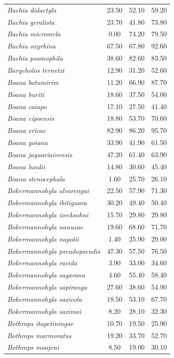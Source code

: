 \documentclass[12pt,openright,oneside,a4paper,english]{abntex2}
\begin{document}
\begin{longtable}{lccc}
	\textit{Bachia didactyla}&23.50 &52.10 &59.20 \\
	\textit{Bachia geralista}&23.70 &41.80 &73.80 \\
	\textit{Bachia micromela}&0.00 &74.20 &79.50 \\
	\textit{Bachia oxyrhina}&67.50 &67.80 &92.60 \\
	\textit{Bachia psamophila}&38.60 &82.60 &83.50 \\
	\textit{Barycholos ternetzi}&12.90 &31.20 &52.60 \\
	\textit{Boana botumirim}&11.20 &66.90 &87.70 \\
	\textit{Boana buriti}&18.60 &37.50 &54.00 \\
	\textit{Boana caiapo}&17.10 &27.50 &41.40 \\
	\textit{Boana cipoensis}&18.80 &53.70 &70.60 \\
	\textit{Boana ericae}&82.90 &86.20 &95.70 \\
	\textit{Boana goiana}&33.90 &41.90 &61.50 \\
	\textit{Boana jaguariaivensis}&47.20 &61.40 &63.90 \\
	\textit{Boana lundii}&14.80 &30.60 &45.40 \\
	\textit{Boana stenocephala}&1.60 &25.70 &26.10 \\
	\textit{Bokermannohyla alvarengai}&22.50 &57.90 &71.30 \\
	\textit{Bokermannohyla ibitiguara}&30.20 &49.40 &50.40 \\
	\textit{Bokermannohyla izecksohni}&15.70 &29.80 &29.80 \\
	\textit{Bokermannohyla nanuzae}&19.60 &68.60 &71.70 \\
	\textit{Bokermannohyla napolii}&1.40 &25.90 &29.00 \\
	\textit{Bokermannohyla pseudopseudis}&47.30 &57.50 &76.50 \\
	\textit{Bokermannohyla ravida}&3.90 &33.00 &34.60 \\
	\textit{Bokermannohyla sagarana}&4.60 &55.40 &58.40 \\
	\textit{Bokermannohyla sapiranga}&27.60 &38.60 &54.90 \\
	\textit{Bokermannohyla saxicola}&18.50 &53.10 &67.70 \\
	\textit{Bokermannohyla sazimai}&8.20 &28.10 &32.30 \\
	\textit{Bothrops itapetiningae}&10.70 &19.50 &25.90 \\
	\textit{Bothrops marmoratus}&19.20 &33.70 &52.70 \\
	\textit{Bothrops moojeni}&8.50 &19.00 &30.10 \\

\end{longtable}
\end{document}
